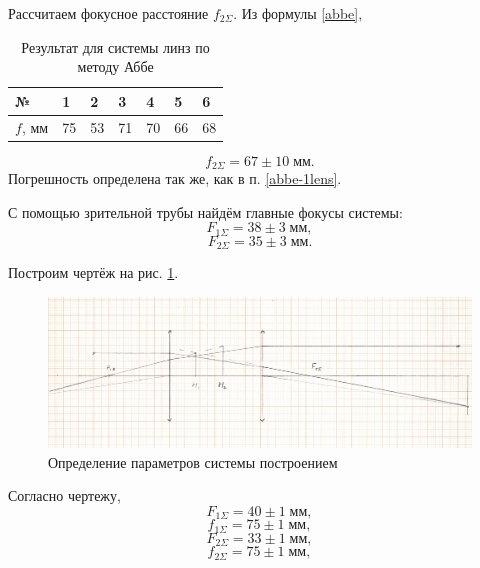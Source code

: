 \documentclass[a4paper]{article}
\newcommand{\picref}[1]{рис. \ref{#1}}
\begin{document}
Рассчитаем фокусное расстояние $ f_{2\Sigma} $.
Из формулы \eqref{abbe}, 
\begin{table}[h]
	\centering
	\begin{tabular}{|l|l|l|l|l|l|l|}
		\hline
		№       & 1  & 2  & 3  & 4  & 5  & 6    \\ \hline
		$f$, мм & 75 & 53 & 71 & 70 & 66 & 68 \\ \hline
	\end{tabular}
	\caption{Результат для системы линз по методу Аббе}
	\label{tab:res2}
\end{table}
\begin{equation*}\label{key}
	f_{2\Sigma} = 67 \pm 10 \; мм.
\end{equation*}
Погрешность определена так же, как в п. \ref{abbe-1lens}.

С помощью зрительной трубы найдём главные фокусы системы:
\begin{equation*}\label{key}
	F_{1\Sigma} = 38 \pm 3 \; мм,
\end{equation*}
\begin{equation*}\label{key}
	F_{2\Sigma} = 35 \pm 3 \; мм.
\end{equation*}

Построим чертёж на \picref{5}.

\begin{figure}[tbp]
	\centering
	\includegraphics[width=\linewidth]{2021-02-17_085129}
	\caption{Определение параметров системы построением}
	\label{5}
\end{figure}


Согласно чертежу, 
\begin{equation*}\label{key}
	F_{1\Sigma} = 40\pm 1 \; мм,
\end{equation*}
\begin{equation*}\label{key}
	f_{1\Sigma} = 75\pm 1\; мм,	
\end{equation*}
\begin{equation*}\label{key}
	F_{2\Sigma} = 33\pm 1 \; мм,
\end{equation*}
\begin{equation*}\label{key}
	f_{2\Sigma} = 75\pm 1\; мм,
\end{equation*}
\end{document}

